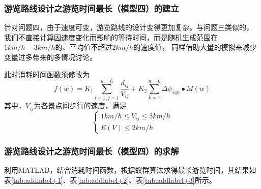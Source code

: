 \documentclass[hyperref,UTF8]{article}
\begin{document}
{\subsubsection{游览路线设计之游览时间最长（模型四）的建立}
针对问题四，由于速度可变，游览路线的设计变得更加复杂。与问题三类似的，
我们不直接计算因速度变化而影响的等待时间，而是随机生成范围在$1km/h-3km/h$的、平均值不超过$2km/h$的速度值，
同样借助大量的模拟来减少变量过多带来的多情况讨论。

此时消耗时间函数须修改为
\begin{equation}\label{wenti41}
f(w)=K_1\sum_{i=1,j=1}^{n=6}\frac{d_{ij}}{V_{ij}}+K_2\sum_{k=1}^{n=6}\Delta {\psi}_{xyz}\bullet M(w)
\end{equation}
其中，$V_{ij}$为各景点间步行的速度，满足
\begin{equation}\label{wenti21}
\left\{
\begin{array}{c}
1km/h \le V_{ij} \le 3km/h\\
E(V)\le 2km/h
\end{array} \right.
\end{equation}
\subsubsection{游览路线设计之游览时间最长（模型四）的求解}
利用MATLAB，结合消耗时间函数，根据蚁群算法求得最长游览时间，其结果如表\ref{tab:addlabel+1}、表\ref{tab:addlabel+2}、表\ref{tab:addlabel+3}所示。

}
\end{document}
